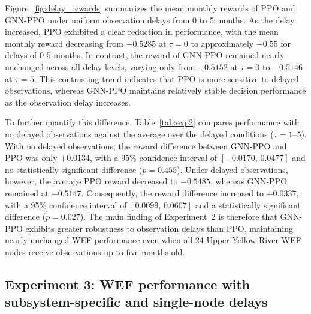 \documentclass [a4paper,fleqn] {cas-dc}
\begin{document}
Figure~\ref{fig:delay_rewards} summarizes the mean monthly rewards of PPO and GNN-PPO under uniform observation delays from 0 to 5 months. As the delay increased, PPO exhibited a clear reduction in performance, with the mean monthly reward decreasing from $-0.5285$ at $\tau=0$ to approximately $-0.55$ for delays of 0-5 months. In contrast, the reward of GNN-PPO remained nearly unchanged across all delay levels, varying only from $-0.5152$ at $\tau=0$ to $-0.5146$ at $\tau=5$. This contrasting trend indicates that PPO is more sensitive to delayed observations, whereas GNN-PPO maintains relatively stable decision performance as the observation delay increases.

To further quantify this difference, Table~\ref{tab:exp2} compares performance with no delayed observations against the average over the delayed conditions ($\tau=1$--$5$). With no delayed observations, the reward difference between GNN-PPO and PPO was only $+0.0134$, with a 95\% confidence interval of $[-0.0170,\,0.0477]$ and no statistically significant difference ($p=0.455$). Under delayed observations, however, the average PPO reward decreased to $-0.5485$, whereas GNN-PPO remained at $-0.5147$. Consequently, the reward difference increased to $+0.0337$, with a 95\% confidence interval of $[0.0099,\,0.0607]$ and a statistically significant difference ($p=0.027$). The main finding of Experiment~2 is therefore that GNN-PPO exhibits greater robustness to observation delays than PPO, maintaining nearly unchanged WEF performance even when all 24 Upper Yellow River WEF nodes receive observations up to five months old.

\subsection{Experiment 3: WEF performance with subsystem-specific and single-node delays}
\label{sec44}
\end{document}
